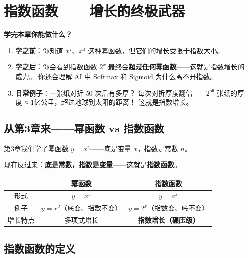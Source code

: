 
\chapter{指数函数——增长的终极武器}

\begin{applicationbox}
\textbf{学完本章你能做什么？}
\begin{enumerate}
  \item \textbf{学之前}：你知道 \(x^2\)、\(x^3\) 这种幂函数，但它们的增长受限于指数大小。
  \item \textbf{学之后}：你会看到指数函数 \(2^x\) 最终会\textbf{超过任何幂函数}——这就是指数增长的威力。
        你还会理解 AI 中 Softmax 和 Sigmoid 为什么离不开指数。
  \item \textbf{日常例子}：一张纸对折 50 次后有多厚？
        每次对折厚度翻倍——\(2^{50}\) 张纸的厚度 ≈ 1亿公里，超过地球到太阳的距离！
        这就是指数增长。
\end{enumerate}
\end{applicationbox}


\section{从第3章来——幂函数 vs 指数函数}

第3章我们学了幂函数 \(y = x^n\)——底是变量 \(x\)，指数是常数 \(n\)。

现在反过来：\textbf{底是常数，指数是变量}——这就是\textbf{指数函数}。

\begin{center}
\begin{tabular}{c|c|c}
 & \textbf{幂函数} & \textbf{指数函数} \\
\hline
形式 & \(y = x^n\) & \(y = a^x\) \\
例子 & \(y = x^2\)（底变、指数不变） & \(y = 2^x\)（指数变、底不变） \\
增长特点 & 多项式增长 & \textbf{指数增长（碾压级）} \\
\end{tabular}
\end{center}


\section{指数函数的定义}

